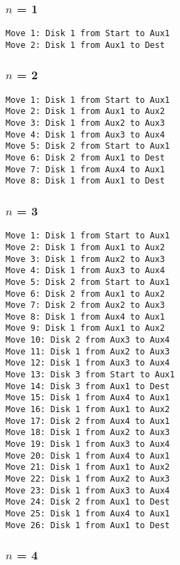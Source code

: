 \documentclass[11pt]{article}
\begin{document}
\begin{multicols}{2}

\subsubsection*{$n$ = 1}

\begin{Verbatim}[fontsize=\small]
Move 1: Disk 1 from Start to Aux1
Move 2: Disk 1 from Aux1 to Dest
\end{Verbatim}

\subsubsection*{$n$ = 2}

\begin{Verbatim}[fontsize=\small]
Move 1: Disk 1 from Start to Aux1
Move 2: Disk 1 from Aux1 to Aux2
Move 3: Disk 1 from Aux2 to Aux3
Move 4: Disk 1 from Aux3 to Aux4
Move 5: Disk 2 from Start to Aux1
Move 6: Disk 2 from Aux1 to Dest
Move 7: Disk 1 from Aux4 to Aux1
Move 8: Disk 1 from Aux1 to Dest
\end{Verbatim}

\subsubsection*{$n$ = 3}

\begin{Verbatim}[fontsize=\small]
Move 1: Disk 1 from Start to Aux1
Move 2: Disk 1 from Aux1 to Aux2
Move 3: Disk 1 from Aux2 to Aux3
Move 4: Disk 1 from Aux3 to Aux4
Move 5: Disk 2 from Start to Aux1
Move 6: Disk 2 from Aux1 to Aux2
Move 7: Disk 2 from Aux2 to Aux3
Move 8: Disk 1 from Aux4 to Aux1
Move 9: Disk 1 from Aux1 to Aux2
Move 10: Disk 2 from Aux3 to Aux4
Move 11: Disk 1 from Aux2 to Aux3
Move 12: Disk 1 from Aux3 to Aux4
Move 13: Disk 3 from Start to Aux1
Move 14: Disk 3 from Aux1 to Dest
Move 15: Disk 1 from Aux4 to Aux1
Move 16: Disk 1 from Aux1 to Aux2
Move 17: Disk 2 from Aux4 to Aux1
Move 18: Disk 1 from Aux2 to Aux3
Move 19: Disk 1 from Aux3 to Aux4
Move 20: Disk 1 from Aux4 to Aux1
Move 21: Disk 1 from Aux1 to Aux2
Move 22: Disk 1 from Aux2 to Aux3
Move 23: Disk 1 from Aux3 to Aux4
Move 24: Disk 2 from Aux1 to Dest
Move 25: Disk 1 from Aux4 to Aux1
Move 26: Disk 1 from Aux1 to Dest
\end{Verbatim}

\subsubsection*{$n$ = 4}


\end{multicols}
\end{document}
